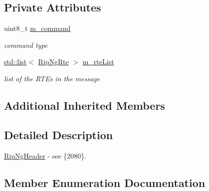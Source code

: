 \subsection*{Private Attributes}
\begin{DoxyCompactItemize}
\item 
uint8\+\_\+t \hyperlink{classns3_1_1RipNgHeader_a073aebe444005580d978c0121fb842fc}{m\+\_\+command}
\begin{DoxyCompactList}\small\item\em command type \end{DoxyCompactList}\item 
\hyperlink{openflow-interface_8h_afd9bcfa176617760671b67580f536fa7}{std\+::list}$<$ \hyperlink{classns3_1_1RipNgRte}{Rip\+Ng\+Rte} $>$ \hyperlink{classns3_1_1RipNgHeader_a988dbcaa0b4bfbc0e635eb43ada954d5}{m\+\_\+rte\+List}
\begin{DoxyCompactList}\small\item\em list of the R\+T\+Es in the message \end{DoxyCompactList}\end{DoxyCompactItemize}
\subsection*{Additional Inherited Members}


\subsection{Detailed Description}
\hyperlink{classns3_1_1RipNgHeader}{Rip\+Ng\+Header} -\/ see \{2080\}. 

\subsection{Member Enumeration Documentation}
